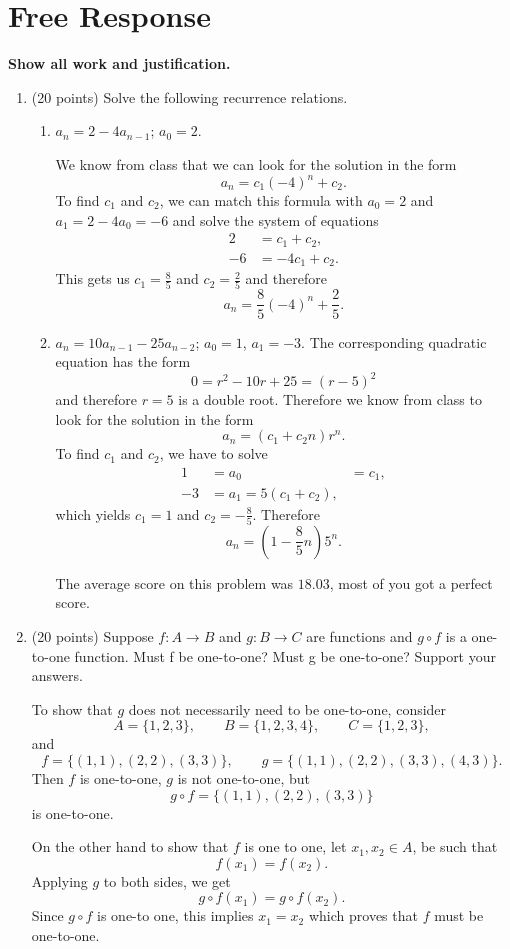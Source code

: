 \documentclass[12pt]{article}
\begin{document}
\section*{Free Response}

\textbf{Show all work and justification.} 

\begin{enumerate}
\item (20 points) Solve the following recurrence relations.
\begin{enumerate}
\item $a_n=2-4a_{n-1}$; $a_0=2$.

We know from class that we can look for the solution in the form
\[
a_n=c_1(-4)^n+c_2.
\]
To find $c_1$ and $c_2$, we can match this formula with $a_0=2$ and $a_1=2-4a_0=-6$ and solve the system of equations
\begin{align*}
2&=c_1+c_2,\\
-6&=-4c_1+c_2.
\end{align*}
This gets us $c_1=\frac{8}{5}$ and $c_2=\frac{2}{5}$ and therefore
\[
a_n=\frac{8}{5}(-4)^n+\frac{2}{5}.
\]
\item $a_n=10a_{n-1}-25a_{n-2}$; $a_0=1$, $a_1=-3$.
The corresponding quadratic equation has the form
\[
0=r^2-10r+25=(r-5)^2
\]
and therefore $r=5$ is a double root. Therefore we know from class to look for the solution in the form
\[
a_n=(c_1+c_2n)r^n.
\]
To find $c_1$ and $c_2$, we have to solve
\begin{align*}
1&=a_0&=c_1,\\
-3&=a_1=5(c_1+c_2),
\end{align*}
which yields $c_1=1$ and $c_2=-\frac{8}{5}$. Therefore
\[
a_n=(1-\frac{8}{5}n)5^n.
\]
\vspace{4cm}

The average score on this problem was $18.03$, most of you got a perfect score.
\end{enumerate}
\newpage
\item (20 points) Suppose $f : A\to B$ and $g : B\to C$ are functions and $g\circ f$  is a one-to-one function.
Must f be one-to-one? Must g be one-to-one? Support your answers.

To show that $g$ does not necessarily need to be one-to-one, consider
\[
A=\{1,2,3\},\qquad B=\{1,2,3,4\},\qquad C=\{1,2,3\},
\]
and 
\[
f=\{(1,1),(2,2),(3,3)\},\qquad g=\{(1,1),(2,2),(3,3),(4,3)\}.
\]
Then $f$ is one-to-one, $g$ is not one-to-one, but
\[
g\circ f=\{(1,1),(2,2),(3,3)\}
\]
is one-to-one.

On the other hand to show that $f$ is one to one, let $x_1,x_2\in A$, be such that
\[
f(x_1)=f(x_2).
\]
Applying $g$ to both sides, we get
\[
g\circ f(x_1)=g\circ f(x_2).
\]
Since $g\circ f$ is one-to one, this implies $x_1=x_2$ which proves that $f$ must be one-to-one.


\end{enumerate}
\end{document}
